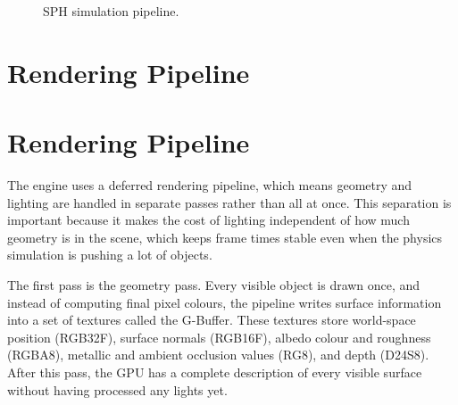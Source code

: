 \documentclass[9pt,openany]{extbook}
\begin{document}
\begin{figure}[H]
\centering
{}
\caption{SPH simulation pipeline.}
\label{fig:sph_pipeline}
\end{figure}

\section{Rendering Pipeline}

\section{Rendering Pipeline}

The engine uses a deferred rendering pipeline, which means geometry and lighting are handled in separate passes rather than all at once. This separation is important because it makes the cost of lighting independent of how much geometry is in the scene, which keeps frame times stable even when the physics simulation is pushing a lot of objects.

The first pass is the geometry pass. Every visible object is drawn once, and instead of computing final pixel colours, the pipeline writes surface information into a set of textures called the G-Buffer. These textures store world-space position (RGB32F), surface normals (RGB16F), albedo colour and roughness (RGBA8), metallic and ambient occlusion values (RG8), and depth (D24S8). After this pass, the GPU has a complete description of every visible surface without having processed any lights yet.
\end{document}
